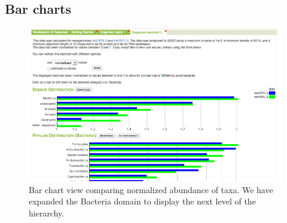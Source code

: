 \documentclass[12pt,fullpage]{report}
\begin{document}




\subsection{Bar charts}
\label{section:bar-charts}

\begin{figure}
\begin{center}
\includegraphics[width=6in]{Images/analysis-page-bar-chart.png}
\end{center}
\caption{
Bar chart view comparing normalized abundance of taxa. We have expanded the Bacteria domain to display the next level of the hierarchy.
}
\label{fig:analysis-page-bar-chart}
\end{figure}
\end{document}
